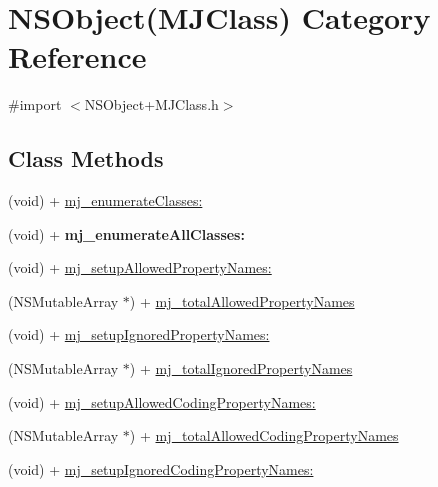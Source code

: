 \hypertarget{category_n_s_object_07_m_j_class_08}{}\section{N\+S\+Object(M\+J\+Class) Category Reference}
\label{category_n_s_object_07_m_j_class_08}


{\ttfamily \#import $<$N\+S\+Object+\+M\+J\+Class.\+h$>$}

\subsection*{Class Methods}
\begin{DoxyCompactItemize}
\item 
(void) + \mbox{\hyperlink{category_n_s_object_07_m_j_class_08_a3f9ef2567bf4f59be9a67cba74dc2cac}{mj\+\_\+enumerate\+Classes\+:}}
\item 
\mbox{\label{category_n_s_object_07_m_j_class_08_a7247385f9e6d741b88bf2b1d93da9896}} 
(void) + {\bfseries mj\+\_\+enumerate\+All\+Classes\+:}
\item 
(void) + \mbox{\hyperlink{category_n_s_object_07_m_j_class_08_a8a14f8d0e4307834475f58536240810f}{mj\+\_\+setup\+Allowed\+Property\+Names\+:}}
\item 
(N\+S\+Mutable\+Array $\ast$) + \mbox{\hyperlink{category_n_s_object_07_m_j_class_08_a3a21a15ef7f5f746a92acc1c1ebcd739}{mj\+\_\+total\+Allowed\+Property\+Names}}
\item 
(void) + \mbox{\hyperlink{category_n_s_object_07_m_j_class_08_afd37a503c0b0d605038315aef0d3ef33}{mj\+\_\+setup\+Ignored\+Property\+Names\+:}}
\item 
(N\+S\+Mutable\+Array $\ast$) + \mbox{\hyperlink{category_n_s_object_07_m_j_class_08_a62bed31696e6d0dd4b3ed5460eaf123e}{mj\+\_\+total\+Ignored\+Property\+Names}}
\item 
(void) + \mbox{\hyperlink{category_n_s_object_07_m_j_class_08_a8b463753f75f643f380cfe86d7223b2d}{mj\+\_\+setup\+Allowed\+Coding\+Property\+Names\+:}}
\item 
(N\+S\+Mutable\+Array $\ast$) + \mbox{\hyperlink{category_n_s_object_07_m_j_class_08_ab44bc8c5c15e061e75ac2a68de745e1a}{mj\+\_\+total\+Allowed\+Coding\+Property\+Names}}
\item 
(void) + \mbox{\hyperlink{category_n_s_object_07_m_j_class_08_ad89c658e8ab42bcba921a1c6e921c1cd}{mj\+\_\+setup\+Ignored\+Coding\+Property\+Names\+:}}

\end{DoxyCompactItemize}
